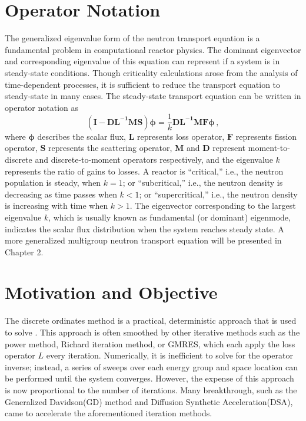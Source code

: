 \section{Operator Notation}
The generalized eigenvalue form of the neutron transport equation is a fundamental problem in computational reactor physics.
The dominant eigenvector and corresponding eigenvalue of this equation can represent if a system is in steady-state conditions.
Though criticality calculations arose from the analysis of time-dependent processes, it is sufficient to reduce the transport equation to steady-state in many cases. 
The steady-state transport equation can be written in operator notation as
\begin{equation}
 \mathbf{(I - DL^{-1}MS)} \mathbf{\phi} = \frac{1}{k} \mathbf{DL^{-1}MF} \mathbf{\phi}  \, ,
 \label{eq:keig}
\end{equation}
where $\mathbf{\phi} $ describes the scalar flux, $\mathbf{L}$ represents loss operator,  $\mathbf{F}$ represents fission operator, $\mathbf{S}$ represents the scattering operator, $\mathbf{M}$ and $\mathbf{D}$ represent moment-to-discrete and discrete-to-moment operators respectively, and the eigenvalue $k$ represents the ratio of gains to losses.
A reactor is ``critical,'' i.e., the neutron population is steady, when $k = 1$; or ``subcritical,'' i.e., the neutron density is decreasing as time passes when $k < 1$; or ``supercritical,'' i.e., the neutron density is increasing with time when $k>1$.
The eigenvector corresponding to the largest eigenvalue $k$, which is usually known as fundamental (or dominant) eigenmode, indicates the scalar flux distribution when the system reaches steady state.
A more generalized multigroup neutron transport equation will be presented in Chapter 2.

\section{Motivation and Objective}
The discrete ordinates method is a practical, deterministic approach that is used to solve .
This approach is often smoothed by other iterative methods such as the power method, Richard iteration method, or GMRES, which each apply the loss operator $L$ every iteration.
Numerically, it is inefficient to solve for the operator inverse; instead, a series of sweeps over each energy group and space location can be performed until the system converges.  
However, the expense of this approach is now proportional to the number of iterations.
Many breakthrough, such as the Generalized Davidson(GD) method and Diffusion Synthetic Acceleration(DSA), came to accelerate the aforementioned iteration methods.

